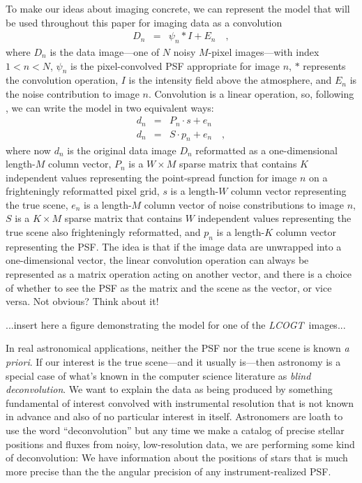 \documentclass[12pt,preprint]{aastex}
\newcommand{\foreign}[1]{\textit{#1}}
\newcommand{\project}[1]{\textsl{#1}}
\newcommand{\LCOGT}{\project{LCOGT}}
\begin{document}
To make our ideas about imaging concrete, we can represent the model
that will be used throughout this paper for imaging data as a
convolution
\begin{eqnarray}\displaystyle
D_n &=& \psi_n \ast I + E_n
\quad ,
\end{eqnarray}
where $D_n$ is the data image---one of $N$ noisy $M$-pixel
images---with index $1<n<N$, $\psi_n$ is the pixel-convolved PSF
appropriate for image $n$, $\ast$ represents the convolution
operation, $I$ is the intensity field above the atmosphere, and $E_n$
is the noise contribution to image $n$.  Convolution is a linear
operation, so, following \citet{hirsch}, we can write the model in two
equivalent ways:
\begin{eqnarray}\displaystyle
d_n &=& P_n \cdot s + e_n
\\
d_n &=& S \cdot p_n + e_n
\quad ,
\end{eqnarray}
where now $d_n$ is the original data image $D_n$ reformatted as a
one-dimensional length-$M$ column vector, $P_n$ is a $W\times M$
sparse matrix that contains $K$ independent values representing the
point-spread function for image $n$ on a frighteningly reformatted
pixel grid, $s$ is a length-$W$ column vector representing the true
scene, $e_n$ is a length-$M$ column vector of noise constributions to
image $n$, $S$ is a $K\times M$ sparse matrix that contains $W$
independent values representing the true scene also frighteningly
reformatted, and $p_n$ is a length-$K$ column vector representing the
PSF.  The idea is that if the image data are unwrapped into a
one-dimensional vector, the linear convolution operation can always be
represented as a matrix operation acting on another vector, and there
is a choice of whether to see the PSF as the matrix and the scene as
the vector, or vice versa.  Not obvious?  Think about it!

...insert here a figure demonstrating the model for one of the \LCOGT\ images...

In real astronomical applications, neither the PSF nor the true scene
is known \foreign{a priori}.  If our interest is the true scene---and
it usually is---then astronomy is a special case of what's known in
the computer science literature as \emph{blind deconvolution}.  We
want to explain the data as being produced by something fundamental of
interest convolved with instrumental resolution that is not known in
advance and also of no particular interest in itself.  Astronomers are
loath to use the word ``deconvolution'' but any time we make a catalog
of precise stellar positions and fluxes from noisy, low-resolution
data, we are performing some kind of deconvolution: We have
information about the positions of stars that is much more precise
than the the angular precision of any instrument-realized PSF.
\end{document}

